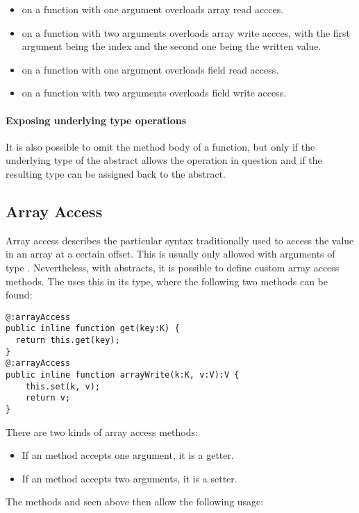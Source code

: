 \begin{itemize}
	\item {} on a function with one argument overloads array read accces.
	\item {} on a function with two arguments overloads array write accces, with the first argument being the index and the second one being the written value.
	\item {} on a function with one argument overloads field read access.
	\item {} on a function with two arguments overloads field write access.
\end{itemize}



\paragraph{Exposing underlying type operations}

It is also possible to omit the method body of a  function, but only if the underlying type of the abstract allows the operation in question and if the resulting type can be assigned back to the abstract.




\subsection{Array Access}
\label{types-abstract-array-access}

Array access describes the particular syntax traditionally used to access the value in an array at a certain offset. This is usually only allowed with arguments of type . Nevertheless, with abstracts, it is possible to define custom array access methods. The  uses this in its  type, where the following two methods can be found:

\begin{lstlisting}
@:arrayAccess
public inline function get(key:K) {
  return this.get(key);
}
@:arrayAccess
public inline function arrayWrite(k:K, v:V):V {
	this.set(k, v);
	return v;
}
\end{lstlisting}
There are two kinds of array access methods:

\begin{itemize}
	\item If an  method accepts one argument, it is a getter.
	\item If an  method accepts two arguments, it is a setter.
\end{itemize}
The methods  and  seen above then allow the following usage:

